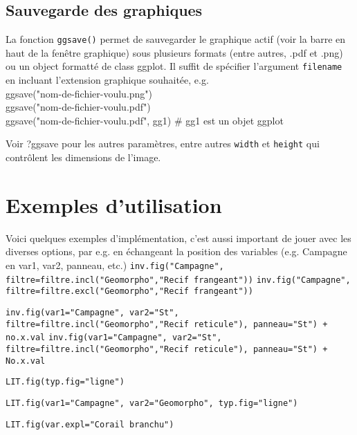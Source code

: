 \documentclass[12pt]{article}
\begin{document}
\subsection{Sauvegarde des graphiques}
La fonction \texttt{ggsave()} permet de sauvegarder le graphique actif (voir la barre en haut de la fenêtre graphique) sous plusieurs formats (entre autres, .pdf et .png) ou un object formatté de class ggplot. Il suffit de spécifier l'argument \texttt{filename} en incluant l'extension graphique souhaitée, e.g.\\
ggsave("nom-de-fichier-voulu.png")\\
ggsave("nom-de-fichier-voulu.pdf")\\
ggsave("nom-de-fichier-voulu.pdf", gg1) \# gg1 est un objet ggplot

Voir ?ggsave pour les autres paramètres, entre autres \texttt{width} et \texttt{height} qui contrôlent les dimensions de l'image. 

\section{Exemples d'utilisation}

Voici quelques exemples d'implémentation, c’est aussi important de jouer avec les diverses options, par e.g. en échangeant la position des variables (e.g. Campagne en var1, var2, panneau, etc.)
\clearpage
\texttt{inv.fig("Campagne", filtre=filtre.incl("Geomorpho","Recif frangeant"))}
\clearpage
\texttt{inv.fig("Campagne", filtre=filtre.excl("Geomorpho","Recif frangeant"))}
\clearpage



\texttt{inv.fig(var1="Campagne", var2="St", filtre=filtre.incl("Geomorpho","Recif reticule"), panneau="St") + no.x.val}
\clearpage
\texttt{inv.fig(var1="Campagne", var2="St", filtre=filtre.incl("Geomorpho","Recif reticule"), panneau="St") + No.x.val}
\clearpage


\texttt{LIT.fig(typ.fig="ligne")}
\clearpage

\texttt{LIT.fig(var1="Campagne", var2="Geomorpho", typ.fig="ligne")}
\clearpage

\texttt{LIT.fig(var.expl="Corail branchu")}
\clearpage
\end{document}
